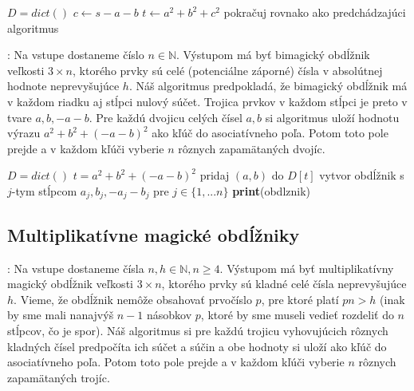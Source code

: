 \begin{algorithmic}
\STATE $D = dict()$
		\STATE $c \gets s-a-b$
		\STATE $t \gets a^2+b^2+c^2$
		\STATE pokračuj rovnako ako predchádzajúci algoritmus
	\ENDFOR
\ENDFOR
\end{algorithmic}

\begin{subalg}: Na vstupe dostaneme číslo $n \in \mathbb{N}$. Výstupom má byť bimagický obdĺžnik veľkosti $3 \times n$, ktorého prvky sú celé (potenciálne záporné) čísla v absolútnej hodnote neprevyšujúce $h$. Náš algoritmus predpokladá, že bimagický obdĺžnik má v každom riadku aj stĺpci nulový súčet. Trojica prvkov v každom stĺpci je preto v tvare $a, b, -a-b$. Pre každú dvojicu celých čísel $a,b$ si algoritmus uloží hodnotu výrazu $a^2 + b^2 + (-a-b)^2$ ako kľúč do asociatívneho poľa. Potom toto pole prejde a v každom kľúči vyberie $n$ rôznych zapamätaných dvojíc.
\end{subalg}

\begin{algorithmic}
\STATE $D = dict()$
		\STATE $t = a^2 + b^2 + (-a-b)^2$
		\STATE pridaj $(a,b)$ do $D[t]$
	\ENDFOR
\ENDFOR
{}
				\STATE vytvor obdĺžnik s $j$-tym stĺpcom $a_j, b_j, - a_j - b_j$ pre $j \in \{1, ... n\}$
					\STATE \textbf{print}(obdlznik)
				\ENDIF
			\ENDFOR
		\ENDIF
	\ENDFOR
\ENDFOR
\end{algorithmic}


\subsection{Multiplikatívne magické obdĺžniky}

\begin{subalg}: Na vstupe dostaneme čísla $n,h \in \mathbb{N}, n \geq 4$. Výstupom má byť multiplikatívny magický obdĺžnik veľkosti $3 \times n$, ktorého prvky sú kladné celé čísla neprevyšujúce $h$. Vieme, že obdĺžnik nemôže obsahovať prvočíslo $p$, pre ktoré platí $pn > h$ (inak by sme mali nanajvýš $n-1$ násobkov $p$, ktoré by sme museli vedieť rozdeliť do $n$ stĺpcov, čo je spor). Náš algoritmus si pre každú trojicu vyhovujúcich rôznych kladných čísel predpočíta ich súčet a súčin a obe hodnoty si uloží ako kľúč do asociatívneho poľa. Potom toto pole prejde a v každom kľúči vyberie $n$ rôznych zapamätaných trojíc.
\end{subalg}

